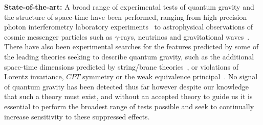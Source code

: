 \documentclass[a4paper,11pt]{article}
\begin{document}
\textbf{State-of-the-art:} A broad range of experimental tests of quantum gravity and the structure of space-time have been performed, ranging from high precision photon interferometry laboratory experiments~\cite{Chou:2015sle} to astrophysical observations of cosmic messenger particles such as $\gamma$-rays, neutrinos and gravitational waves~\cite{Lieu:2003ee, Abdo2009, HESS:2011aa, Perlman_2015, Vasileiou2015, PhysRevD.99.083009, Cooke:2020rco, Amelino-Camelia:2016fuh, ELLIS2019352, PhysRevD.102.063027, Wei:2018ajw, Calcagni:2020ume}. There have also been experimental searches for the features predicted by some of the leading theories seeking to describe quantum gravity, such as the additional space-time dimensions predicted by string/brane theories~\cite{Aad:2012ic, Carena:2017qhd, Sirunyan:2018ipj}, or violations of Lorentz invariance, $CPT$ symmetry or the weak equivalence principal~\cite{Bennett:2007aa, Aartsen:2017ibm, ELLIS2019352, PhysRevD.102.063027, Wei:2018ajw, Daniel:2015mua, Pruttivarasin:2014pja, Kostelecky:2015dpa, Abe:2014wla, Kostelecky:2013rv}. No signal of quantum gravity has been detected thus far however despite our knowledge that such a theory must exist, and without an accepted theory to guide us it is essential to perform the broadest range of tests possible and seek to continually increase sensitivity to these suppressed effects. \\







\end{document}
